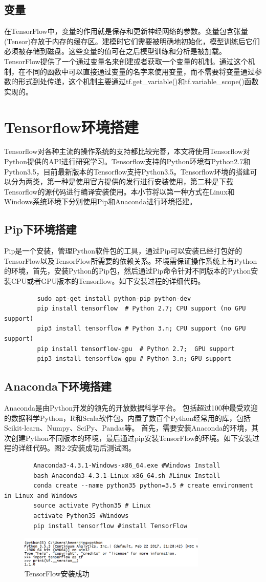 		\subsection{变量}
		在TensorFlow中，变量的作用就是保存和更新神经网络的参数。变量包含张量 (Tensor)存放于内存的缓存区。建模时它们需要被明确地初始化，模型训练后它们必须被存储到磁盘。这些变量的值可在之后模型训练和分析是被加载。 TensorFlow提供了一个通过变量名来创建或者获取一个变量的机制。通过这个机制，在不同的函数中可以直接通过变量的名字来使用变量，而不需要将变量通过参数的形式到处传递，这个机制主要通过tf.get\_variable()和tf.variable\_scope()函数实现的。
	\section{Tensorflow环境搭建}
	Tensorflow对各种主流的操作系统的支持都比较完善，本文将使用Tensorflow对Python提供的API进行研究学习。Tensorflow支持的Python环境有Python2.7和Python3.5，目前最新版本的Tensorflow支持Python3.5。Tensorflow环境的搭建可以分为两类，第一种是使用官方提供的发行进行安装使用，第二种是下载Tensorflow的源代码进行编译安装使用。本小节将以第一种方式在Linux和Windows系统环境下分别使用Pip和Anaconda进行环境搭建。
		\subsection{Pip下环境搭建}
		Pip是一个安装，管理Python软件包的工具，通过Pip可以安装已经打包好的TensorFlow以及TensorFlow所需要的依赖关系。环境需保证操作系统上有Python的环境，首先，安装Python的Pip包，然后通过Pip命令针对不同版本的Python安装CPU或者GPU版本的Tensorflow。如下安装过程的详细代码。
		\begin{lstlisting}
		 sudo apt-get install python-pip python-dev
		 pip install tensorflow  # Python 2.7; CPU support (no GPU support)
		 pip3 install tensorflow # Python 3.n; CPU support (no GPU support)
		 pip install tensorflow-gpu  # Python 2.7;  GPU support
		 pip3 install tensorflow-gpu # Python 3.n; GPU support
		\end{lstlisting}
		\subsection{Anaconda下环境搭建}
		Anaconda是由Python开发的领先的开放数据科学平台。 包括超过100种最受欢迎的数据科学Python，R和Scala软件包。内置了数百个Python经常用的库，包括Scikit-learn、Numpy、SciPy、Pandas等。 首先，需要安装Anaconda的环境，其次创建Python不同版本的环境，最后通过pip安装TensorFlow的环境。如下安装过程的详细代码。图2-2安装成功后测试图。
		\begin{lstlisting}
		Anaconda3-4.3.1-Windows-x86_64.exe #Windows Install
		bash Anaconda3-4.3.1-Linux-x86_64.sh #Linux Install
		conda create --name python35 python=3.5 # create environment in Linux and Windows
		source activate Python35 # Linux
		activate Python35 #Windows
		pip install tensorflow #install TensorFlow
		\end{lstlisting}
		
		\begin{figure}[!ht]
			\centering
			\includegraphics[width=0.8\textwidth]{figures/2-2}
			\caption{TensorFlow安装成功}
			\label{fig:2-2}
		\end{figure}